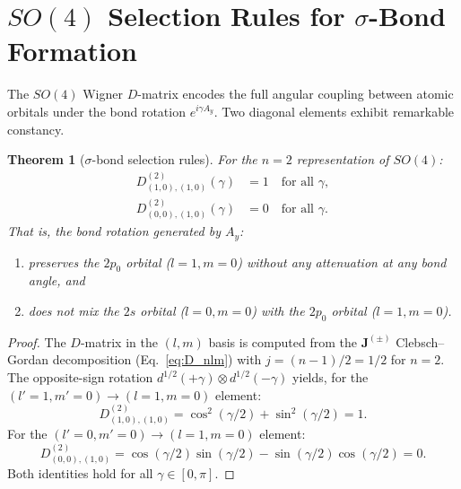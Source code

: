 \documentclass[aps,pra,twocolumn,superscriptaddress,longbibliography]{revtex4-2}
\newtheorem{theorem}{Theorem}
\begin{document}
\section{$SO(4)$ Selection Rules for $\sigma$-Bond Formation}
\label{sec:selection_rules}

The $SO(4)$ Wigner $D$-matrix encodes the full angular coupling between
atomic orbitals under the bond rotation $e^{i\gamma A_y}$.  Two diagonal
elements exhibit remarkable constancy.

\begin{theorem}[$\sigma$-bond selection rules]
\label{thm:selection}
For the $n = 2$ representation of $SO(4)$:
\begin{align}
D^{(2)}_{(1,0),(1,0)}(\gamma) &= 1 \quad \text{for all } \gamma,
\label{eq:D2_1010} \\
D^{(2)}_{(0,0),(1,0)}(\gamma) &= 0 \quad \text{for all } \gamma.
\label{eq:D2_0010}
\end{align}
That is, the bond rotation generated by $A_y$:
\begin{enumerate}
\item preserves the $2p_0$ orbital ($l = 1, m = 0$) without any
attenuation at any bond angle, and
\item does not mix the $2s$ orbital ($l = 0, m = 0$) with the $2p_0$
orbital ($l = 1, m = 0$).
\end{enumerate}
\end{theorem}

\begin{proof}
The $D$-matrix in the $(l, m)$ basis is computed from the
$\mathbf{J}^{(\pm)}$ Clebsch--Gordan decomposition
(Eq.~\eqref{eq:D_nlm}) with $j = (n-1)/2 = 1/2$ for $n = 2$.
The opposite-sign rotation $d^{1/2}(+\gamma) \otimes d^{1/2}(-\gamma)$
yields, for the $(l' = 1, m' = 0) \to (l = 1, m = 0)$ element:
\begin{equation}
D^{(2)}_{(1,0),(1,0)} = \cos^2(\gamma/2) + \sin^2(\gamma/2) = 1.
\end{equation}
For the $(l' = 0, m' = 0) \to (l = 1, m = 0)$ element:
\begin{equation}
D^{(2)}_{(0,0),(1,0)} = \cos(\gamma/2)\sin(\gamma/2)
                       - \sin(\gamma/2)\cos(\gamma/2) = 0.
\end{equation}
Both identities hold for all $\gamma \in [0, \pi]$.
\end{proof}
\end{document}
